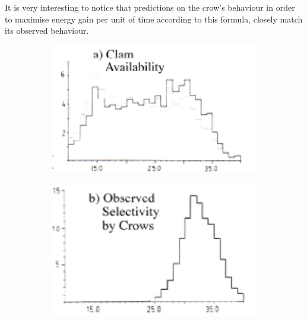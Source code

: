 \documentclass{mproj}
\begin{document}
It is very interesting to notice that predictions on the crow's behaviour in order to maximise energy gain per unit of time according to this formula, closely match its observed behaviour.
\begin{figure}[!h]
        \centering
	\caption{frequency of clams in class size (\% on y axis) by clam length (x axis)}
	\label{fig:clams}
        \begin{subfigure} [h] {0.3\textwidth}
                \centering
                \includegraphics [width=1\textwidth] {clam1.png}
		\caption{}
        \end{subfigure}
        \space
        \space
        \begin{subfigure} [h] {0.3\textwidth}
                \centering
                \includegraphics [width=1\textwidth] {clam2.png}
		\caption{}


\end{subfigure}
\end{figure}
\end{document}
